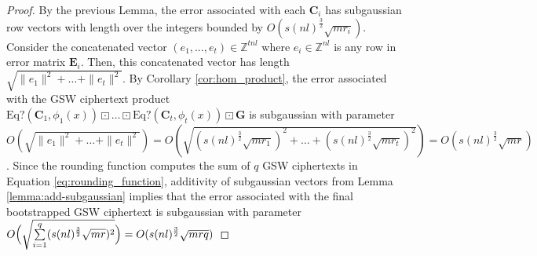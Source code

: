 \begin{proof}
    By the previous Lemma, the error associated with each $\mathbf{C}_i$ has subgaussian row vectors with length over the integers bounded by $O(s(nl)^\frac{3}{2}\sqrt{mr_i})$. Consider the concatenated vector $(e_1, \dots, e_{t}) \in \mathbb{Z}^{tnl}$ where $e_i \in \mathbb{Z}^{nl}$ is any row in error matrix $\mathbf{E}_i$. Then, this concatenated vector has length $\sqrt{\|e_1\|^2 + \dots + \|e_t\|^2}$. By Corollary \ref{cor:hom_product}, the error associated with the GSW ciphertext product $\text{Eq?}(\mathbf{C}_1, \phi_1(x)) \boxdot \dots \boxdot \text{Eq?}(\mathbf{C}_t, \phi_t(x)) \boxdot \mathbf{G}$ is subgaussian with parameter $O(\sqrt{\|e_1\|^2 + \dots + \|e_t\|^2}) = O(\sqrt{(s(nl)^\frac{3}{2}\sqrt{mr_1})^2 + \dots + (s(nl)^\frac{3}{2}\sqrt{mr_t})^2}) = O(s(nl)^\frac{3}{2}\sqrt{mr})$. Since the rounding function computes the sum of $q$ GSW ciphertexts in Equation \ref{eq:rounding_function}, additivity of subgaussian vectors from Lemma \ref{lemma:add-subgaussian} implies that the error associated with the final bootstrapped GSW ciphertext is subgaussian with parameter $O\Bigl(\sqrt{\sum\limits_{i = 1}^{q}(s(nl)^\frac{3}{2}\sqrt{mr})^2}\Bigr) = O(s(nl)^\frac{3}{2}\sqrt{mrq})$
\end{proof}

